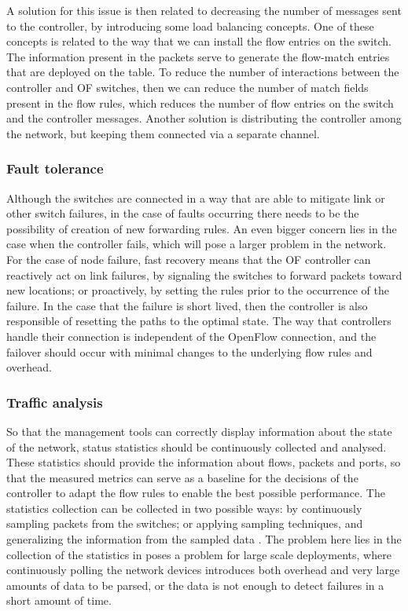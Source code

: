 \begin {enumerate}
\begin{enumerate}
\par A solution for this issue is then related to decreasing the number of messages sent to the controller, by introducing some load balancing concepts. One of
these concepts is related to the way that we can install the flow entries on the switch. The information present in the packets serve to generate the flow-match
entries that are deployed on the table. To reduce the number of interactions between the controller and OF switches, then we can reduce the number of match fields
present in the flow rules, which reduces the number of flow entries on the switch and the controller messages. Another solution is distributing the controller among
the network, but keeping them connected via a separate channel.

\subsubsection {Fault tolerance} \label{sec:fault_tolerance}

Although the switches are connected in a way that are able to mitigate link or other switch failures, in the case of faults occurring there needs to be the
possibility of creation of new forwarding rules. An even bigger concern lies in the case when the controller fails, which will pose a larger problem in the network. 
For the case of node failure, fast recovery means that the OF controller can reactively act on link failures, by signaling the switches to forward packets toward 
new locations; or proactively, by setting the rules prior to the occurrence of the failure. In the case that the failure is short lived, then the controller is also 
responsible of resetting the paths to the optimal state. The way that controllers handle their connection is independent of the OpenFlow connection, and the
failover should occur with minimal changes to the underlying flow rules and overhead.

\subsubsection {Traffic analysis}

So that the management tools can correctly display information about the state of the network, status statistics should be continuously collected and analysed. These
statistics should provide the information about flows, packets and ports, so that the measured metrics can serve as a baseline for the decisions of the controller to
adapt the flow rules to enable the best possible performance. The statistics collection can be collected in two possible ways: by continuously sampling
packets from the switches; or applying sampling techniques, and generalizing the information from the sampled data \cite{curtis_mahout:_2011}. The problem here lies
in the collection of the statistics in poses a problem for large scale deployments, where continuously polling the network devices introduces both overhead and very 
large amounts of data to be parsed, or the data is not enough to detect failures in a short amount of time. 


\end{enumerate}
\end{enumerate}
